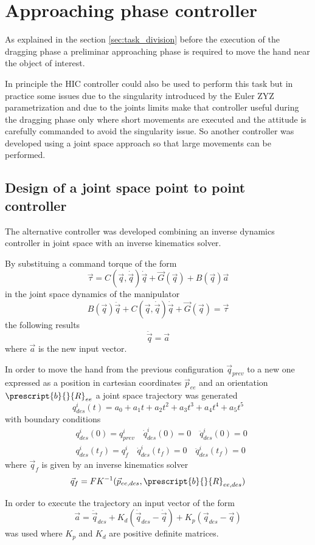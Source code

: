 \section{Approaching phase controller}
As explained in the section \ref{sec:task_division} before the execution of the dragging phase
a preliminar approaching phase is required  to move the hand near the object of interest.
\par
In principle the HIC controller could also be used to perform this task but in practice
some issues due to the singularity introduced by the Euler ZYZ parametrization and due to the
joints limits make that controller useful during the dragging phase only where short movements are executed
and the attitude is carefully commanded to avoid the singularity issue.
So another controller was developed using a joint space approach so that large movements can be performed.

\subsection{Design of a joint space point to point controller}
The alternative controller was developed combining an inverse dynamics controller in joint
space with an inverse kinematics solver.
\par
By substituing a command torque of the form
\[
\vec{\tau} = C(\vec{q}, \dot{\vec{q}}) \dot{\vec{q}} + \vec{G}(\vec{q}) + B(\vec{q}) \vec{a}
\]
in the joint space dynamics of the manipulator
\[
  B(\vec{q})\ddot{\vec{q}} + C(\vec{q}, \dot{\vec{q}}) \dot{\vec{q}} + \vec{G}(\vec{q}) = \vec{\tau}
\]
the following results
\[
\ddot{\vec{q}} = \vec{a}
\]
where $\vec{a}$ is the new input vector.
\par
In order to move the hand from the previous configuration $\vec{q}_{prev}$
to a new one expressed as a position in cartesian coordinates $\vec{p}_{ee}$ and
an orientation $\prescript{b}{}{R}_{ee}$ a joint space trajectory was generated
\[
q_{des}^{i}(t) = a_0 + a_1 t + a_2 t^2 + a_3 t^3 + a_4 t^4 + a_5 t^5
\]
with boundary conditions
\[
\begin{split}
  &q_{des}^{i}(0) = q_{prev}^{i} \quad \dot{q}_{des}^{i}(0) = 0 \quad \ddot{q}_{des}^{i}(0) = 0\\
  &q_{des}^{i}(t_f) = q_{f}^{i} \quad \dot{q}_{des}^{i}(t_f) = 0 \quad \ddot{q}_{des}^{i}(t_f) = 0
\end{split}
\]
where $\vec{q}_{f}$ is given by an inverse kinematics solver
\[
\vec{q}_{f} = FK^{-1}(\vec{p}_{ee,des},\prescript{b}{}{R}_{ee,des})
\]
\par
In order to execute the trajectory an input vector of the form
\[
\vec{a} = \ddot{\vec{q}}_{des} + K_d(\dot{\vec{q}}_{des} - \dot{\vec{q}}) + K_p(\vec{q}_{des} - \vec{q})
\]
was used where $K_p$ and $K_d$ are positive definite matrices.
\newpage

